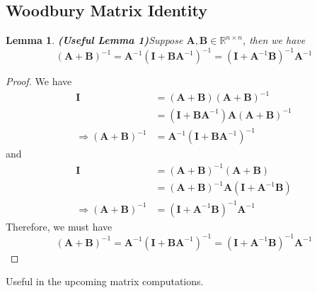 \documentclass[13pt]{article}
\newtheorem{lemma}[theorem]{Lemma}
\theoremstyle{definition}
\theoremstyle{remark}
\newenvironment{remark}
  {\pushQED{\qed}\renewcommand{\qedsymbol}{$\triangle$}\remarkx}
  {\popQED\endremarkx}
\begin{document}



\subsection{Woodbury Matrix Identity}
\begin{lemma} \textbf{(Useful Lemma 1)}\label{lemma:inverse matrix sum}
Suppose $\mathbf{A}, \mathbf{B}\in \mathbb{R}^{n\times n}$, then we have
\[
(\mathbf{A}+\mathbf{B})^{-1} = \mathbf{A}^{-1}(\mathbf{\mathbf{I}}+\mathbf{B}\mathbf{A}^{-1})^{-1} = (\mathbf{\mathbf{I}}+\mathbf{A}^{-1}\mathbf{B})^{-1}\mathbf{A}^{-1}
\]
\end{lemma}
\begin{proof}
    We have
    \begin{align*}
        \mathbf{\mathbf{I}} &= (\mathbf{A}+\mathbf{B})(\mathbf{A}+\mathbf{B})^{-1}\\
        &= (\mathbf{\mathbf{I}}+\mathbf{B}\mathbf{A}^{-1})\mathbf{A}(\mathbf{A}+\mathbf{B})^{-1}\\
        \Longrightarrow (\mathbf{A}+\mathbf{B})^{-1} &=\mathbf{A}^{-1}(\mathbf{\mathbf{I}}+\mathbf{B}\mathbf{A}^{-1})^{-1}
    \end{align*}
    and 
    \begin{align*}
        \mathbf{\mathbf{I}} &= (\mathbf{A}+\mathbf{B})^{-1}(\mathbf{A}+\mathbf{B})\\
        &= (\mathbf{A}+\mathbf{B})^{-1}\mathbf{A}(\mathbf{\mathbf{I}}+\mathbf{A}^{-1}\mathbf{B})\\
        \Longrightarrow (\mathbf{A}+\mathbf{B})^{-1} &=(\mathbf{\mathbf{I}}+\mathbf{A}^{-1}\mathbf{B})^{-1}\mathbf{A}^{-1}
    \end{align*}
    Therefore, we must have
    \[
    (\mathbf{A}+\mathbf{B})^{-1} = \mathbf{A}^{-1}(\mathbf{\mathbf{I}}+\mathbf{B}\mathbf{A}^{-1})^{-1} = (\mathbf{\mathbf{I}}+\mathbf{A}^{-1}\mathbf{B})^{-1}\mathbf{A}^{-1}
    \]
\end{proof}
\begin{remark}
    Useful in the upcoming matrix computations.
\end{remark}
\end{document}
